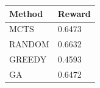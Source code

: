 \begin{tabular}{ll}
\hline
Method & Reward \\
\hline
  MCTS & 0.6473 \\
  RANDOM & 0.6632 \\
  GREEDY & 0.4593 \\
  GA & 0.6472 \\
\hline
\end{tabular}
